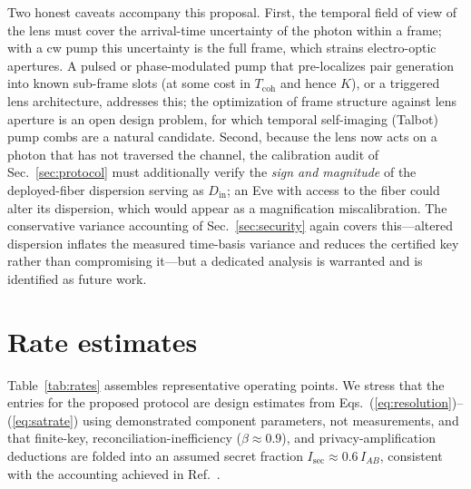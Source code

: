 \documentclass[11pt]{article}
\begin{document}
Two honest caveats accompany this proposal. First, the temporal field of view of the lens must cover the arrival-time uncertainty of the photon within a frame; with a cw pump this uncertainty is the full frame, which strains electro-optic apertures. A pulsed or phase-modulated pump that pre-localizes pair generation into known sub-frame slots (at some cost in $T_{\mathrm{coh}}$ and hence $K$), or a triggered lens architecture, addresses this; the optimization of frame structure against lens aperture is an open design problem, for which temporal self-imaging (Talbot) pump combs are a natural candidate. Second, because the lens now acts on a photon that has not traversed the channel, the calibration audit of Sec.~\ref{sec:protocol} must additionally verify the \emph{sign and magnitude} of the deployed-fiber dispersion serving as $D_{\mathrm{in}}$; an Eve with access to the fiber could alter its dispersion, which would appear as a magnification miscalibration. The conservative variance accounting of Sec.~\ref{sec:security} again covers this---altered dispersion inflates the measured time-basis variance and reduces the certified key rather than compromising it---but a dedicated analysis is warranted and is identified as future work.

\section{Rate estimates}
\label{sec:rates}

Table~\ref{tab:rates} assembles representative operating points. We stress that the entries for the proposed protocol are design estimates from Eqs.~(\ref{eq:resolution})--(\ref{eq:satrate}) using demonstrated component parameters, not measurements, and that finite-key, reconciliation-inefficiency ($\beta \approx 0.9$), and privacy-amplification deductions are folded into an assumed secret fraction $I_{\mathrm{sec}} \approx 0.6\, I_{AB}$, consistent with the accounting achieved in Ref.~\cite{Zhong2015}.
\end{document}

